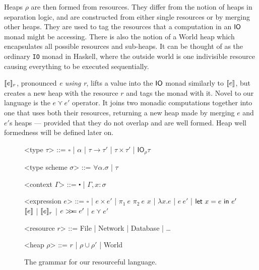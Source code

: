 Heaps $\rho$ are then formed from resources. They differ from the notion
of heaps in separation logic, and are constructed from either single
resources or by merging other heaps.  They are used to tag the
resources that a computation in an $\IO$ monad might be
accessing. There is also the notion of a \textsf{World} heap which
encapsulates all possible resources and sub-heaps. It can be thought
of as the ordinary \texttt{IO} monad in Haskell, where
the outside world is one indivisible resource causing everything to be
executed sequentially.

$\use{r}{e}$, pronounced \textit{e using r}, lifts a value into the
$\IO$ monad similarly to $\lift{e}$, but creates a new heap with the
resource $r$ and tags the monad with it. Novel to our language is the
$e \curlyvee e'$ operator. It joins two monadic computations together into one
that uses both their resources, returning a new heap made by merging
$e$ and $e'$s heaps --- provided that they do not overlap and are well
formed. Heap well formedness will be defined later on.

\begin{figure}
\begin{grammar}

  <type $\tau$> ::= $\square$ | $\alpha$ | $\tau \rightarrow \tau'$ | $\tau \times \tau'$ | $\textsf{IO}_\rho \tau$
  
  <type scheme $\sigma$> ::= $\forall \alpha . \sigma$ | $\tau$

  <context $\Gamma$> ::= $\centerdot$ | $\Gamma , x : \sigma$

  <expression $e$> ::= $\square$ | $e \times e'$ | $\pi_1 \ e$ $\pi_2 \ e$
  \alt $x$ | $\lambda x . e$ | $e \ e'$ | $\letin{x = e}{e'}$
  \alt $\lift{e}$ | $\use{r}{e}$ | $e \bind e'$ | $e \curlyvee e'$

  <resource $r$> ::= \textsf{File} | \textsf{Network} |
  \textsf{Database} | \ldots

  <heap $\rho$> ::= $r$ | $\rho \cup \rho'$ | \textsf{World}

\end{grammar}
\caption{The grammar for our resourceful language.}\label{fig:grammar}
\end{figure}

